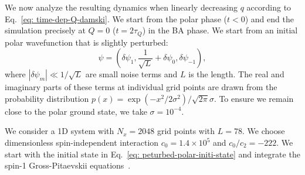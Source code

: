 We now analyze the resulting dynamics when linearly decreasing \( q \) according to
Eq.~\eqref{eq: time-dep-Q-damski}.
We start from the polar phase (\( t < 0 \)) and end the simulation precisely at
\( Q = 0 \) (\( t=2\tau_Q \)) in the BA phase.
We start from an initial polar wavefunction that is slightly perturbed:
\begin{equation}
    \psi = \left(\delta\psi_1, \frac{1}{\sqrt{L}} + \delta\psi_0,
    \delta\psi_{-1}\right),
    \label{eq: peturbed-polar-initi-state}
\end{equation}
where \( |\delta\psi_m| \ll 1 / \sqrt{L} \) are small noise terms and \( L \) is
the length.
The real and imaginary parts of these terms at individual grid points are drawn
from the probability distribution
\( p(x) = \exp(-x^2/2\sigma^2)/\sqrt{2\pi}\sigma \).
To ensure we remain close to the polar ground state, we take
\( \sigma=10^{-4} \).

We consider a 1D system with \(N_x = 2048\) grid points with \(L=78\).
We choose dimensionless spin-independent interaction \(c_0=1.4\times10^5\) and 
\(c_0/c_2 = -222\).
We start with the initial state in Eq.~\eqref{eq: peturbed-polar-initi-state}
and integrate the spin-1 Gross-Pitaevskii equations~\cite{Symes2016}.

